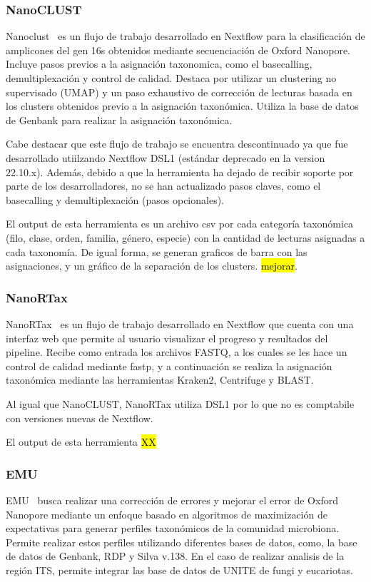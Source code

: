 \subsubsection{NanoCLUST}
Nanoclust~\cite{10.1093/bioinformatics/btaa900} es un flujo de trabajo desarrollado en Nextflow para la clasificación de amplicones del gen 16s obtenidos mediante secuenciación de Oxford Nanopore. Incluye pasos previos a la asignación taxonomica, como el basecalling, demultiplexación y control de calidad. Destaca por utilizar un clustering no supervisado (UMAP) y un paso exhaustivo de corrección de lecturas basada en los clusters obtenidos previo a la asignación taxonómica.
Utiliza la base de datos de Genbank para realizar la asignación taxonómica.

Cabe destacar que este flujo de trabajo se encuentra descontinuado ya que fue desarrollado utiilzando Nextflow DSL1 (estándar deprecado en la version 22.10.x). Además, debido a que la herramienta ha dejado de recibir soporte por parte de los desarrolladores, no se han actualizado pasos claves, como el basecalling y demultiplexación (pasos opcionales).

El output de esta herramienta es un archivo csv por cada categoría taxonómica (filo, clase, orden, familia, género, especie) con la cantidad de lecturas asignadas a cada taxonomía. De igual forma, se generan graficos de barra con las asignaciones, y un gráfico de la separación de los clusters. \hl{mejorar}. 
\subsubsection{NanoRTax}

NanoRTax~\cite{RODRIGUEZPEREZ20225350} es un flujo de trabajo desarrollado en Nextflow que cuenta con una interfaz web que permite al usuario visualizar el progreso y resultados del pipeline.
Recibe como entrada los archivos FASTQ, a los cuales se les hace un control de calidad mediante fastp, y a continuación se realiza la asignación taxonómica mediante las herramientas Kraken2, Centrifuge y BLAST. 

Al igual que NanoCLUST, NanoRTax utiliza DSL1 por lo que no es comptabile con versiones nuevas de Nextflow.

El output de esta herramienta \hl{XX}
\subsubsection{EMU}
EMU~\cite{curry2022emu} busca realizar una corrección de errores y mejorar el error de Oxford Nanopore mediante un enfoque basado en algoritmos de maximización de expectativas para generar perfiles taxonómicos de la comunidad microbiona. Permite realizar estos perfiles utilizando diferentes bases de datos, como, la base de datos de Genbank,  RDP y Silva v.138. En el caso de realizar analisis de la región ITS, permite integrar las base de datos de UNITE de fungi y eucariotas.

